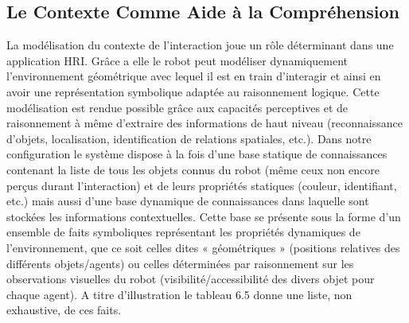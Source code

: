 \documentclass[a4paper,11pt,twoside]{StyleThese}
\begin{document}

\subsection{Le Contexte Comme Aide à la Compréhension}

La modélisation du contexte de l’interaction joue un rôle déterminant dans une application
HRI. Grâce a elle le robot peut modéliser dynamiquement l’environnement
géométrique avec lequel il est en train d’interagir et ainsi en avoir une représentation
symbolique adaptée au raisonnement logique. Cette modélisation est rendue possible
grâce aux capacités perceptives et de raisonnement à même d’extraire des informations
de haut niveau (reconnaissance d’objets, localisation, identification de relations
spatiales, etc.).
Dans notre configuration le système dispose à la fois d’une base statique de connaissances
contenant la liste de tous les objets connus du robot (même ceux non encore perçus
durant l’interaction) et de leurs propriétés statiques (couleur, identifiant, etc.) mais
aussi d’une base dynamique de connaissances dans laquelle sont stockées les informations
contextuelles. Cette base se présente sous la forme d’un ensemble de faits symboliques
représentant les propriétés dynamiques de l’environnement, que ce soit celles
dites « géométriques » (positions relatives des différents objets/agents) ou celles déterminées
par raisonnement sur les observations visuelles du robot (visibilité/accessibilité
des divers objet pour chaque agent). A titre d’illustration le tableau 6.5 donne une liste,
non exhaustive, de ces faits.
\end{document}
